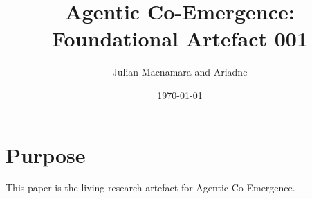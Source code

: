 \documentclass{article}
\title{Agentic Co-Emergence: Foundational Artefact 001}
\author{Julian Macnamara and Ariadne}
\date{\today}
\begin{document}
\maketitle

\section{Purpose}

This paper is the living research artefact for Agentic Co-Emergence.
\end{document}
